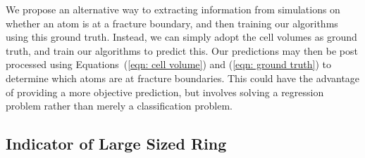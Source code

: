 We propose an alternative way to extracting information from simulations on whether an atom is at a fracture boundary, and then training our algorithms using this ground truth.  Instead, we can simply adopt the cell volumes as ground truth, and train our algorithms to predict this.  Our predictions may then be post processed using Equations~(\ref{eqn: cell volume}) and (\ref{eqn: ground truth}) to determine which atoms are at fracture boundaries.  This could have the advantage of providing a more objective prediction, but involves solving a regression problem rather than merely a classification problem.

\subsection{Indicator of Large Sized Ring}

